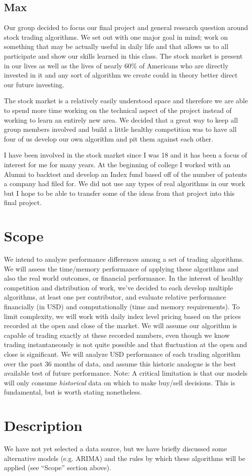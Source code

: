 \documentclass[12pt,english]{article}
\begin{document}
\subsection*{Max}
Our group decided to focus our final project and general research question around stock trading algorithms. We set out with one major goal in mind; work on something that may be actually useful in daily life and that allows us to all participate and show our skills learned in this class. The stock market is present in our lives as well as the lives of nearly 60\% of Americans who are directly invested in it and any sort of algorithm we create could in theory better direct our future investing. 

The stock market is a relatively easily understood space and therefore we are able to spend more time working on the technical aspect of the project instead of working to learn an entirely new area. We decided that a great way to keep all group members involved and build a little healthy competition was to have all four of us develop our own algorithm and pit them against each other. 

I have been involved in the stock market since I was 18 and it has been a focus of interest for me for many years. At the beginning of college I worked with an Alumni to backtest and develop an Index fund based off of the number of patents a company had filed for. We did not use any types of real algorithms in our work but I hope to be able to transfer some of the ideas from that project into this final project.


\section*{Scope}
We intend to analyze performance differences among a set of trading algorithms. We will assess the time/memory performance of applying these algorithms and also the real world outcomes, or financial performance. In the interest of healthy competition and distribution of work, we’ve decided to each develop multiple algorithms, at least one per contributor, and evaluate relative performance financially (in USD) and computationally (time and memory requirements).
\newline\newline
To limit complexity, we will work with daily index level pricing based on the prices recorded at the open and close of the market. We will assume our algorithm is capable of trading exactly at these recorded numbers, even though we know trading instantaneously is not quite possible and that fluctuation at the open and close is significant. We will analyze USD performance of each trading algorithm over the past 36 months of data, and assume this historic analogue is the best available test of future performance.
\newline\newline
Note: A critical limitation is that our models will only consume \textit{historical} data on which to make buy/sell decisions. This is fundamental, but is worth stating nonetheless.

\section*{Description}
We have not yet selected a data source, but we have briefly discussed some alternative models (e.g. ARIMA) and the rules by which these algorithms will be applied (see ``Scope'' section above).

\end{document}
